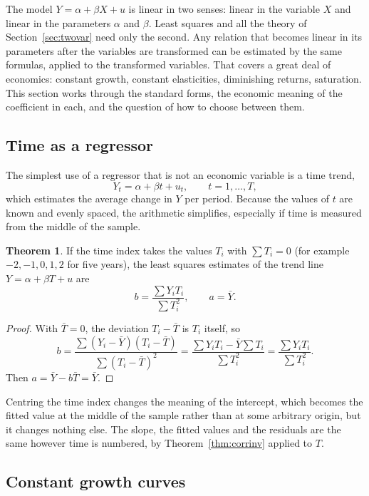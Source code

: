 \documentclass[11pt,a4paper]{article}
\numberwithin{equation}{section}
\theoremstyle{definition}
\newtheorem{thm}{Theorem}[subsection]
\begin{document}
The model $Y = \alpha + \beta X + u$ is linear in two senses: linear in the variable $X$ and linear in the parameters $\alpha$ and $\beta$. Least
squares and all the theory of Section~\ref{sec:twovar} need only the second. Any relation that becomes linear in its parameters after the
variables are transformed can be estimated by the same formulas, applied to the transformed variables. That covers a great deal of economics:
constant growth, constant elasticities, diminishing returns, saturation. This section works through the standard forms, the economic meaning of
the coefficient in each, and the question of how to choose between them.

\subsection{Time as a regressor}
\label{ssec:trend}

The simplest use of a regressor that is not an economic variable is a time trend,
\[
Y_t = \alpha + \beta t + u_t, \qquad t = 1, \dots, T,
\]
which estimates the average change in $Y$ per period. Because the values of $t$ are known and evenly spaced, the arithmetic simplifies,
especially if time is measured from the middle of the sample.

\begin{thm}
\label{thm:centredtrend}
If the time index takes the values $T_i$ with $\sum T_i = 0$ (for example $-2, -1, 0, 1, 2$ for five years), the least squares estimates of the
trend line $Y = \alpha + \beta T + u$ are
\[
b = \frac{\sum Y_iT_i}{\sum T_i^2}, \qquad a = \bar Y .
\]
\end{thm}

\begin{proof}
With $\bar T = 0$, the deviation $T_i - \bar T$ is $T_i$ itself, so
\[
b = \frac{\sum (Y_i - \bar Y)(T_i - \bar T)}{\sum (T_i - \bar T)^2} = \frac{\sum Y_iT_i - \bar Y\sum T_i}{\sum T_i^2} = \frac{\sum Y_iT_i}{\sum T_i^2} .
\]
Then $a = \bar Y - b\bar T = \bar Y$.
\end{proof}

Centring the time index changes the meaning of the intercept, which becomes the fitted value at the middle of the sample rather than at
some arbitrary origin, but it changes nothing else. The slope, the fitted values and the residuals are the same however time is numbered, by
Theorem~\ref{thm:corrinv} applied to $T$.

\subsection{Constant growth curves}
\label{ssec:growth}
\end{document}
